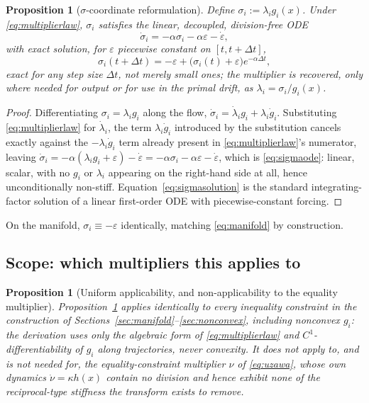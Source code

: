 \documentclass[11pt,onecolumn]{article}
\newtheorem{proposition}[theorem]{Proposition}
\theoremstyle{definition}
\theoremstyle{remark}
\begin{document}
\begin{proposition}[$\sigma$-coordinate reformulation] \label{prop:sigma}
Define $\sigma_i := \lambda_i g_i(x)$. Under \eqref{eq:multiplierlaw}, $\sigma_i$ satisfies the
linear, decoupled, division-free ODE
\begin{equation}
\dot\sigma_i = -\alpha\sigma_i - \alpha\varepsilon - \dot\varepsilon, \label{eq:sigmaode}
\end{equation}
with exact solution, for $\varepsilon$ piecewise constant on $[t, t+\Delta t]$,
\begin{equation}
\sigma_i(t + \Delta t) = -\varepsilon + \big(\sigma_i(t) + \varepsilon\big) e^{-\alpha \Delta t},
\label{eq:sigmasolution}
\end{equation}
exact for any step size $\Delta t$, not merely small ones; the multiplier is recovered, only
where needed for output or for use in the primal drift, as $\lambda_i = \sigma_i / g_i(x)$.
\end{proposition}

\begin{proof}
Differentiating $\sigma_i = \lambda_i g_i$ along the flow,
$\dot\sigma_i = \dot\lambda_i g_i + \lambda_i \dot g_i$. Substituting
\eqref{eq:multiplierlaw} for $\dot\lambda_i$, the term $\lambda_i \dot g_i$ introduced by the
substitution cancels exactly against the $-\lambda_i \dot g_i$ term already present in
\eqref{eq:multiplierlaw}'s numerator, leaving
$\dot\sigma_i = -\alpha(\lambda_i g_i + \varepsilon) - \dot\varepsilon
= -\alpha\sigma_i - \alpha\varepsilon - \dot\varepsilon$, which is \eqref{eq:sigmaode}: linear,
scalar, with no $g_i$ or $\lambda_i$ appearing on the right-hand side at all, hence
unconditionally non-stiff. Equation~\eqref{eq:sigmasolution} is the standard integrating-factor
solution of a linear first-order ODE with piecewise-constant forcing.
\end{proof}

On the manifold, $\sigma_i \equiv -\varepsilon$ identically, matching \eqref{eq:manifold} by
construction.

\subsection{Scope: which multipliers this applies to}

\begin{proposition}[Uniform applicability, and non-applicability to the equality multiplier]
Proposition~\ref{prop:sigma} applies identically to every inequality constraint in the
construction of Sections~\ref{sec:manifold}--\ref{sec:nonconvex}, including nonconvex $g_i$:
the derivation uses only the algebraic form of \eqref{eq:multiplierlaw} and $C^1$-differentiability
of $g_i$ along trajectories, never convexity. It does not apply to, and is not needed for, the
equality-constraint multiplier $\nu$ of \eqref{eq:uzawa}, whose own dynamics
$\dot\nu = \kappa h(x)$ contain no division and hence exhibit none of the reciprocal-type
stiffness the transform exists to remove.
\end{proposition}
\end{document}

